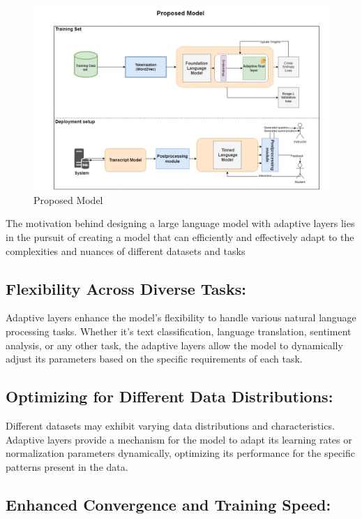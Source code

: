 \begin{figure}[h!]
	\centering
	\includegraphics[max height=\textheight,max width=\textwidth]{figures/proposal-model.jpeg}
	\caption{Proposed Model}
\end{figure}

\newpage
\noindent
The motivation behind designing a large language model with adaptive layers lies in the pursuit of creating a model that can efficiently and effectively adapt to the complexities and nuances of different datasets and tasks

\subsection{Flexibility Across Diverse Tasks:}

Adaptive layers enhance the model's flexibility to handle various natural language processing tasks. Whether it's text classification, language translation, sentiment analysis, or any other task, the adaptive layers allow the model to dynamically adjust its parameters based on the specific requirements of each task.

\subsection{Optimizing for Different Data Distributions:}

Different datasets may exhibit varying data distributions and characteristics. Adaptive layers provide a mechanism for the model to adapt its learning rates or normalization parameters dynamically, optimizing its performance for the specific patterns present in the data.



\subsection{Enhanced Convergence and Training Speed:}

